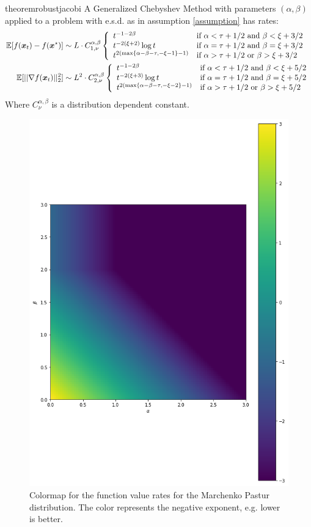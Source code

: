 \documentclass{article}
\begin{document}
\begin{restatable}{theorem}{robustjacobi}\label{thm: jacobirates}
A Generalized Chebyshev Method with parameters $(\alpha,\beta)$ applied to a problem with e.s.d. as in assumption \ref{assumption} has rates:
\begin{align}
\mathbb{E}[f({\boldsymbol x}_t)-f({\boldsymbol x}^\star)]&\sim L\cdot C^{\alpha,\beta}_{1,\nu}
    \left\{\begin{array}{ll}
    t^{-1-2\beta} &\mbox{if } 
		  \alpha<\tau+1/2 \text{ and } \beta <\xi+3/2\\
		  t^{-2(\xi+2)}\log t& \mbox{if } 
		  \alpha=\tau+1/2 \text{ and } \beta =\xi+3/2\\
		  t^{2(\max\{\alpha-\beta-\tau,-\xi-1\}-1)}& \mbox{if } 
		  \alpha>\tau+1/2 \text{ or } \beta >\xi+3/2
	\end{array}\right.\\
	\mathbb{E}[||\nabla f({\boldsymbol x}_t)||^2_2]&\sim L^2\cdot C^{\alpha,\beta}_{2,\nu}
        \left\{\begin{array}{ll}
    t^{-1-2\beta} &\mbox{if } 
		  \alpha<\tau+1/2 \text{ and } \beta <\xi+5/2\\
		  t^{-2(\xi+3)}\log t& \mbox{if } 
		  \alpha=\tau+1/2 \text{ and } \beta =\xi+5/2\\
		  t^{2(\max\{\alpha-\beta-\tau,-\xi-2\}-1)}& \mbox{if } 
		  \alpha>\tau+1/2 \text{ or } \beta >\xi+5/2
	\end{array}\right.
\end{align}
Where $C^{\alpha,\beta}_\nu$ is a distribution dependent constant.
\end{restatable}
\begin{figure}[]
    \centering
    \includegraphics[width=4 cm]{imgs/colormap.png}
    
    \caption{Colormap for the function value rates  for the Marchenko Pastur distribution. The color represents the negative exponent, e.g. lower is better.}
    \label{fig:my_label2}
\end{figure}
\end{document}
